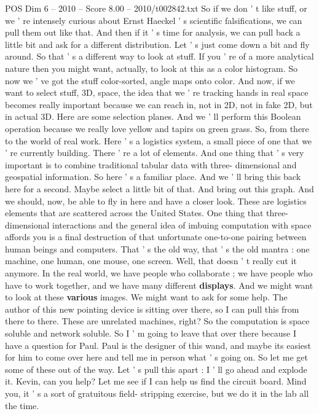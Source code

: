 \begin{textsample}{POS Dim 6 – 2010 – Score 8.00 – 2010/t002842.txt}
So if we don ' t like stuff, or we ' re intensely curious about Ernst Haeckel ' s scientific falsifications, we can pull them out like that.
And then if it ' s time for analysis, we can pull back a little bit and ask for a different distribution.
Let ' s just come down a bit and fly around.
So that ' s a different way to look at stuff.
If you ' re of a more analytical nature then you might want, actually, to look at this as a color histogram.
So now we ' ve got the stuff color-sorted, angle maps onto color.
And now, if we want to select stuff, 3D, space, the idea that we ' re tracking hands in real space becomes really important because we can reach in, not in 2D, not in fake 2D, but in actual 3D.
Here are some selection planes.
And we ' ll perform this Boolean operation because we really love yellow and tapirs on green grass.
So, from there to the world of real work.
Here ' s a logistics system, a small piece of one that we ' re currently building.
There ' re a lot of elements.
And one thing that ' s very important is to combine traditional tabular data with three- dimensional and geospatial information.
So here ' s a familiar place.
And we ' ll bring this back here for a second.
Maybe select a little bit of that.
And bring out this graph.
And we should, now, be able to fly in here and have a closer look.
These are logistics elements that are scattered across the United States.
One thing that three-dimensional interactions and the general idea of imbuing computation with space affords you is a final destruction of that unfortunate one-to-one pairing between human beings and computers.
That ' s the old way, that ' s the old mantra : one machine, one human, one mouse, one screen.
Well, that doesn ' t really cut it anymore.
In the real world, we have people who collaborate ; we have people who have to work together, and we have many different \textbf{displays}.
And we might want to look at these \textbf{various} images.
We might want to ask for some help.
The author of this new pointing device is sitting over there, so I can pull this from there to there.
These are unrelated machines, right?
So the computation is space soluble and network soluble.
So I ' m going to leave that over there because I have a question for Paul.
Paul is the designer of this wand, and maybe its easiest for him to come over here and tell me in person what ' s going on.
So let me get some of these out of the way.
Let ' s pull this apart : I ' ll go ahead and explode it.
Kevin, can you help?
Let me see if I can help us find the circuit board.
Mind you, it ' s a sort of gratuitous field- stripping exercise, but we do it in the lab all the time.

\end{textsample}
